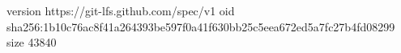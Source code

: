 version https://git-lfs.github.com/spec/v1
oid sha256:1b10c76ac8f41a264393be597f0a41f630bb25c5eea672ed5a7fc27b4fd08299
size 43840
